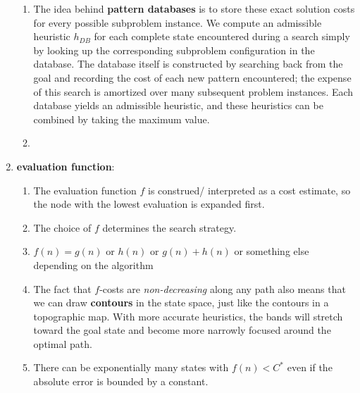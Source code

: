 \begin{enumerate}
\begin{enumerate}
        \item The idea behind \textbf{pattern databases} is to store these exact solution costs for every possible subproblem instance.
        We compute an admissible heuristic $h_{DB}$ for each complete state encountered during a search simply by looking up the corresponding subproblem configuration in the database.
        The database itself is constructed by searching back from the goal and recording the cost of each new pattern encountered; the expense of this search is amortized over many subsequent problem instances.
        Each database yields an admissible heuristic, and these heuristics can be combined by taking the maximum value.
        \hfill \cite{ai/book/Artificial-Intelligence-A-Modern-Approach/Russell-Norvig}

        \item
        \hfill \cite{ai/book/Artificial-Intelligence-A-Modern-Approach/Russell-Norvig}
    \end{enumerate}

    \item \textbf{evaluation function}:
    \begin{enumerate}
        \item The evaluation function $f$ is construed/ interpreted as a cost estimate, so the node with the lowest evaluation is expanded first.
        \hfill \cite{ai/book/Artificial-Intelligence-A-Modern-Approach/Russell-Norvig}

        \item The choice of $f$ determines the search strategy.
        \hfill \cite{ai/book/Artificial-Intelligence-A-Modern-Approach/Russell-Norvig}

        \item $f(n) = g(n)$ or $h(n)$ or $g(n)+h(n)$ or something else depending on the algorithm

        \item The fact that $f$-costs are \textit{non-decreasing} along any path also means that we can draw \textbf{contours} in the state space, just like the contours in a topographic map.
        With more accurate heuristics, the bands will stretch toward the goal state and become more narrowly focused around the optimal path.
        \hfill \cite{ai/book/Artificial-Intelligence-A-Modern-Approach/Russell-Norvig}

        \item There can be exponentially many states with $f(n) < C^\ast$ even if the absolute error is bounded by a constant.
        \hfill \cite{ai/book/Artificial-Intelligence-A-Modern-Approach/Russell-Norvig}



\end{enumerate}
\end{enumerate}

